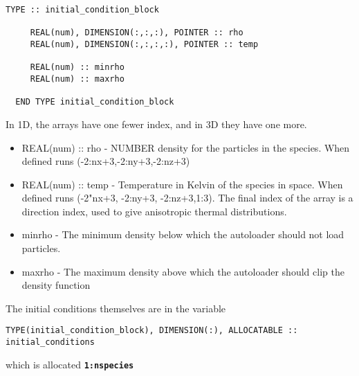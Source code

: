 \documentclass[12pt,a4paper]{article}
\newcommand{\simpleboxverbatim}{\begin{Verbatim}[obeytabs=true,frame=single,
  framerule=0.5mm,rulecolor=\color{warwickmid},formatcom=\color{black}]}
\newcommand{\inlinecode}[1]{{\color{warwickred} \bf\texttt{#1}}}
\begin{document}
\simpleboxverbatim
  TYPE :: initial_condition_block

     REAL(num), DIMENSION(:,:,:), POINTER :: rho
     REAL(num), DIMENSION(:,:,:,:), POINTER :: temp

     REAL(num) :: minrho
     REAL(num) :: maxrho

  END TYPE initial_condition_block
\end{Verbatim}

In 1D, the arrays have one fewer index, and in 3D they have one more.
\begin{itemize}
\item REAL(num) :: rho - NUMBER density for the particles in the species. When
  defined runs (-2:nx+3,-2:ny+3,-2:nz+3)
\item REAL(num) :: temp - Temperature in Kelvin of the species in space. When
  defined runs (-2"nx+3, -2:ny+3, -2:nz+3,1:3). The final index of the array
  is a direction index, used to give anisotropic thermal distributions.
\item minrho - The minimum density below which the autoloader should not load
  particles.
\item maxrho - The maximum density above which the autoloader should clip the
  density function
\end{itemize}

The initial conditions themselves are in the variable
\simpleboxverbatim
  TYPE(initial_condition_block), DIMENSION(:), ALLOCATABLE :: initial_conditions
\end{Verbatim}
which is allocated \inlinecode{1:nspecies}
\end{document}
